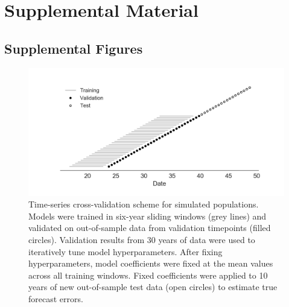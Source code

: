 \setcounter{figure}{0}
\setcounter{table}{0}
\renewcommand{\thefigure}{S\arabic{figure}}
\renewcommand{\thetable}{S\arabic{table}}

\section*{Supplemental Material}

\subsection*{Supplemental Figures}

\begin{figure}[H]
  \begin{center}
  \includegraphics[width=\textwidth]{figures/cross-validation-for-simulated-populations.png}
  \caption{
  Time-series cross-validation scheme for simulated populations.
  Models were trained in six-year sliding windows (grey lines) and validated on out-of-sample data from validation timepoints (filled circles).
  Validation results from 30 years of data were used to iteratively tune model hyperparameters.
  After fixing hyperparameters, model coefficients were fixed at the mean values across all training windows.
  Fixed coefficients were applied to 10 years of new out-of-sample test data (open circles) to estimate true forecast errors.
  }
  \label{sup_fig:cross_validation_for_simulated_populations}
  \end{center}
\end{figure}

